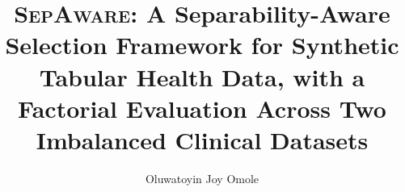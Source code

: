 \documentclass[review,12pt]{elsarticle}
\newcommand{\sepa}{\textsc{SepAware}}
\begin{document}
\begin{frontmatter}

\title{\sepa{}: A Separability-Aware Selection Framework for Synthetic Tabular Health Data, with a Factorial Evaluation Across Two Imbalanced Clinical Datasets}

\author[inst1]{Oluwatoyin Joy Omole}


\end{frontmatter}
\end{document}
